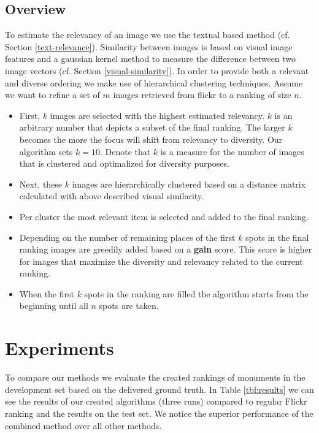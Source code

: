 \documentclass{acm_proc_article-me11_tweaked}
\begin{document}
\subsection{Overview}
To estimate the relevancy of an image we use the textual based method (cf. Section \ref{text-relevance}).
Similarity between images is based on visual image features and a gaussian kernel method to measure the difference between two image vectors (cf. Section \ref{visual-similarity}).
In order to provide both a relevant and diverse ordering we make use of hierarchical clustering techniques.
Assume we want to refine a set of $m$ images retrieved from flickr to a ranking of size $n$.
\begin{itemize}
 \item First, $k$ images are selected with the highest estimated relevancy. $k$ is an arbitrary number that depicts a subset of the final ranking. 
 The larger $k$ becomes the more the focus will shift from relevancy to diversity. Our algorithm sets $k = 10$. Denote that $k$ is a measure for the number of images that is clustered and optimalized for diversity purposes.
 \item Next, these $k$ images are hierarchically clustered based on a distance matrix calculated with above described visual similarity.
 \item Per cluster the most relevant item is selected and added to the final ranking.
 \item Depending on the number of remaining places of the first $k$ spots in the final ranking images are greedily added based on a \textbf{gain} score.
 This score is higher for images that maximize the diversity and relevancy related to the current ranking.
 \item When the first $k$ spots in the ranking are filled the algorithm starts from the beginning until all $n$ spots are taken.
 
\end{itemize}




\section{Experiments}
To compare our methods we evaluate the created rankings of monuments in the development set based on the delivered ground truth.
In Table \ref{tbl:results} we can see the results of our created algorithms (three runs) compared to regular Flickr ranking and the results on the test set.
 We notice the superior performance of the combined method over all other methods.
\end{document}
